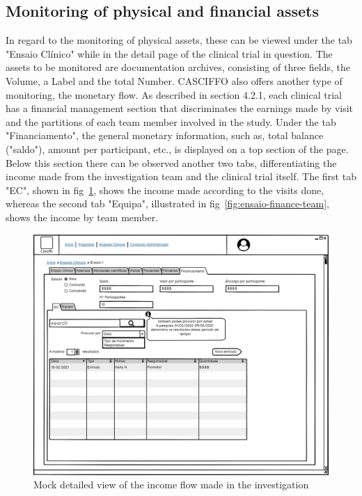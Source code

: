\subsection{Monitoring of physical and financial assets} 
In regard to the monitoring of physical assets, these can be viewed under the tab "Ensaio Clínico" while in the detail page of the clinical trial in question. The assets to be monitored are documentation archives, consisting of three fields, the Volume, a Label and the total Number.
CASCIFFO also offers another type of monitoring, the monetary flow. As described in section 4.2.1, each clinical trial has a financial management section that discriminates the earnings made by visit and the partitions of each team member involved in the study.  
Under the tab "Financiamento", the general monetary information, such as, total balance ("saldo"), amount per participant, etc., is displayed on a top section of the page. Below this section there can be observed another two tabs, differentiating the income made from the investigation team and the clinical trial itself. The first tab "EC", shown in fig~\ref{fig:ensaio-finance-ec}, shows the income made according to the visits done, whereas the second tab "Equipa", illustrated in fig~\ref{fig:ensaio-finance-team}, shows the income by team member.

\begin{figure}[H]
    \centering
    \includegraphics[scale=0.35]{images/ensaio-finance-ec.png}
    \caption{Mock detailed view of the income flow made in the investigation}
    \label{fig:ensaio-finance-ec}
\end{figure}

